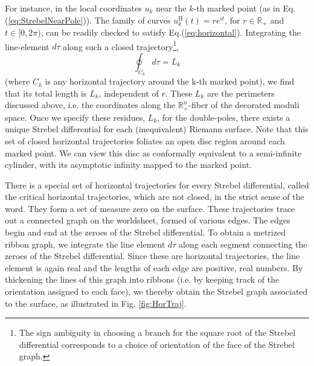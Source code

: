 \documentclass[english]{article}
\renewcommand{\>}{\rangle}
\newcommand{\<}{\langle}
\renewcommand{\(}{\left(}
\renewcommand{\)}{\right)}
\begin{document}
 For instance, in the local coordinates $u_k$ near the $k$-th marked point (as in Eq.(\ref{eq:StrebelNearPole})). The family of curves $u_{k}^{\text{H}}(t) = r e^{i t}$, for $r\in \mathbb{R}_{+}$ and $t \in [0,2\pi)$, can be readily checked to satisfy Eq.(\ref{eq:horizontal}). Integrating the line-element $d\tau$ along such a closed trajectory\footnote{The sign ambiguity in choosing a branch for the square root of the Strebel differential corresponds to a choice of orientation of the face of the Strebel graph.},
\begin{equation}
    \oint_{C_k} d\tau = L_{k} \label{eq:PerimeterInt}
\end{equation}
(where $C_k$ is any horizontal trajectory around the k-th marked point),
we find that its total length is $L_{k}$, independent of $r$. These $L_{k}$ are the perimeters discussed above, i.e. the coordinates along the $\mathbb{R}_{+}^{n}$-fiber of the decorated moduli space. Once we specify these residues, $L_{k}$, for the double-poles, there  exists a unique Strebel differential for each (inequivalent) Riemann surface. Note that this set of closed horizontal trajectories foliates an open disc region around each marked point. We can view this disc as conformally equivalent to a semi-infinite cylinder, with its asymptotic infinity mapped to the marked point. 

There is a special set of horizontal trajectories for every Strebel differential, called the critical horizontal trajectories, which are not closed, in the strict sense of the word. They form a set of measure zero on the surface. These trajectories trace out a connected graph on the worldsheet, formed of various edges. The edges begin and end at the zeroes of the Strebel differential. To obtain a metrized ribbon graph, we integrate the line element $d\tau$ along each segment connecting the zeroes of the Strebel differential. Since these are horizontal trajectories, the line element is again real and the lengths of each edge are positive, real numbers. By thickening the lines of this graph into ribbons (i.e. by keeping track of the orientation assigned to each face), we thereby obtain the Strebel graph associated to the surface, as illustrated in Fig. \ref{fig:HorTraj}.
\end{document}
